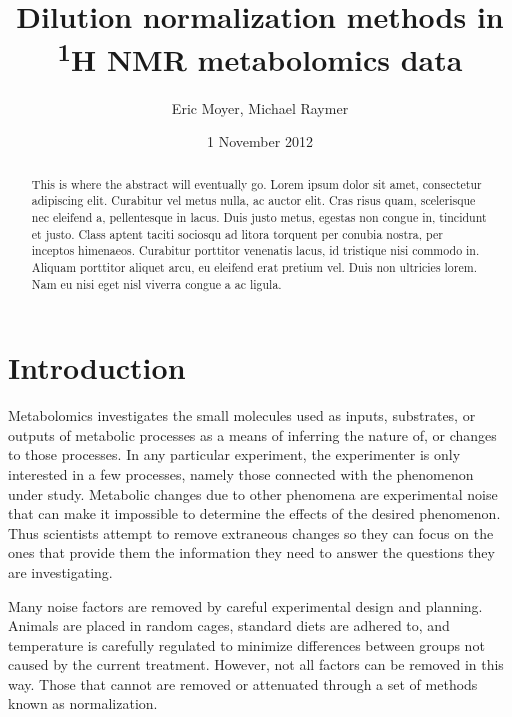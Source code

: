 \documentclass[english]{article}
\begin{document}
\title{Dilution normalization methods in \textsuperscript{1}H NMR metabolomics data}

\author{Eric Moyer, Michael Raymer}

\date{1 November 2012}

\maketitle

\begin{abstract}
This is where the abstract will eventually go. Lorem ipsum dolor sit amet, consectetur adipiscing elit. Curabitur vel metus nulla, ac auctor elit. Cras risus quam, scelerisque nec eleifend a, pellentesque in lacus. Duis justo metus, egestas non congue in, tincidunt et justo. Class aptent taciti sociosqu ad litora torquent per conubia nostra, per inceptos himenaeos. Curabitur porttitor venenatis lacus, id tristique nisi commodo in. Aliquam porttitor aliquet arcu, eu eleifend erat pretium vel. Duis non ultricies lorem. Nam eu nisi eget nisl viverra congue a ac ligula.
\end{abstract}

\section{Introduction}
Metabolomics investigates the small molecules used as inputs, substrates, or outputs of metabolic processes as a means of inferring the nature of, or changes to those processes. In any particular experiment, the experimenter is only interested in a few processes, namely those connected with the phenomenon under study. Metabolic changes due to other phenomena are experimental noise that can make it impossible to determine the effects of the desired phenomenon. Thus scientists attempt to remove extraneous changes so they can focus on the ones that provide them the information they need to answer the questions they are investigating.

Many noise factors are removed by careful experimental design and planning. Animals are placed in random cages, standard diets are adhered to, and temperature is carefully regulated to minimize differences between groups not caused by the current treatment. However, not all factors can be removed in this way. Those that cannot are removed or attenuated through a set of methods known as normalization.
\end{document}

